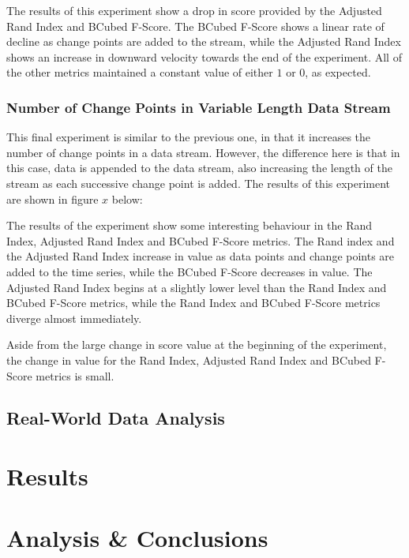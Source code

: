 \documentclass{uvamscse}	%
\begin{document}

The results of this experiment show a drop in score provided by the Adjusted Rand Index and BCubed F-Score. The BCubed F-Score shows a linear rate of decline as change points are added to the stream, while the Adjusted Rand Index shows an increase in downward velocity towards the end of the experiment. All of the other metrics maintained a constant value of either $1$ or $0$, as expected.

\subsection{Number of Change Points in Variable Length Data Stream}

This final experiment is similar to the previous one, in that it increases the number of change points in a data stream. However, the difference here is that in this case, data is appended to the data stream, also increasing the length of the stream as each successive change point is added. The results of this experiment are shown in figure $x$ below:


The results of the experiment show some interesting behaviour in the Rand Index, Adjusted Rand Index and BCubed F-Score metrics. The Rand index and the Adjusted Rand Index increase in value as data points and change points are added to the time series, while the BCubed F-Score decreases in value. The Adjusted Rand Index begins at a slightly lower level than the Rand Index and BCubed F-Score metrics, while the Rand Index and BCubed F-Score metrics diverge almost immediately.

Aside from the large change in score value at the beginning of the experiment, the change in value for the Rand Index, Adjusted Rand Index and BCubed F-Score metrics is small.

\section{Real-World Data Analysis}


\chapter{Results}


\chapter{Analysis \& Conclusions}





\newpage

\end{document}
